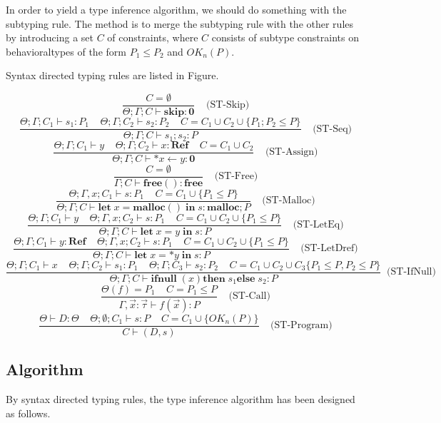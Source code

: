 \documentclass[english]{jssst_ppl} %
\newcommand\LET{\mathbf{let}\;}
\newcommand\IN{\mathbf{in}\;}
\newcommand\SKIP{\mathbf{skip}}
\newcommand\Rtab{\; \; \; \;}
\newcommand\IFNULL{\mathbf{ifnull}\;}
\newcommand\THEN{\mathbf{then}\;}
\newcommand\ELSE{\mathbf{else}\;}
\newcommand\Malloc{\mathbf{malloc}}
\newcommand\Free{\mathbf{free}}
\newcommand\Cirx{(x)}
\begin{document}
In order to yield a type inference algorithm, we should do something with the subtyping rule. The method is to merge the subtyping rule with the other rules by introducing a set $C$ of constraints, where $C$ consists of subtype constraints on behavioraltypes of the form $P_{1}\le P_{2}$ and $OK_{n}(P)$.

Syntax directed typing rules are listed in Figure.

$$
     \frac{ C = \emptyset}
           {\Theta; \Gamma; C \vdash \SKIP : \mathbf{0}}
      \Rtab \mbox{(ST-Skip)}
$$
$$
      \frac{\Theta;\Gamma ; C_{1} \vdash s_{1} : P_{1} \Rtab \Theta; \Gamma ; C_{2} \vdash s_{2} : P_{2} \Rtab C = C_{1}\cup C_{2} \cup \{ P_{1};P_{2} \le P\}}
      {\Theta;\Gamma; C \vdash s_{1};s_{2} : P}
      \Rtab \mbox{(ST-Seq)}
$$
$$
      \frac{\Theta;\Gamma;C_{1} \vdash y \Rtab \Theta;\Gamma; C_{2} \vdash x : \mathbf{Ref} \Rtab C = C_{1}\cup C_{2}}
      {\Theta;\Gamma; C \vdash *x \leftarrow y : \mathbf{0}}
      \Rtab \mbox{(ST-Assign)}
$$
$$
      \frac{C = \emptyset}
      {\Gamma ; C \vdash \Free() : \Free}
     \Rtab \mbox{(ST-Free)}
$$
$$
     \frac{\Theta;\Gamma, x ; C_{1} \vdash s : P_{1} \Rtab C = C_{1} \cup\{P_{1}\le P\}}
     {\Theta;\Gamma; C \vdash \LET x = \Malloc() \; \IN s : \Malloc ; P}
     \Rtab \mbox{(ST-Malloc)}
$$
$$
     \frac{\Theta;\Gamma; C_{1} \vdash y \Rtab \Theta;\Gamma, x ; C_{2} \vdash s : P_{1} \Rtab C = C_{1}\cup C_{2} \cup \{P_{1} \le P \}}
     {\Theta;\Gamma ; C \vdash \LET x = y \;  \IN s : P}
     \Rtab \mbox{(ST-LetEq)}
$$
$$
     \frac{\Theta;\Gamma ; C_{1} \vdash y: \mathbf{Ref} \Rtab \Theta;\Gamma, x ; C_{2} \vdash s : P_{1} \Rtab C = C_{1}\cup C_{2}\cup\{P_{1} \le P\}}
     {\Theta;\Gamma ; C \vdash \LET x = *y \; \IN s : P}
     \Rtab \mbox{(ST-LetDref)}
$$
$$
     \frac{\Theta;\Gamma; C_{1} \vdash x \Rtab \Theta;\Gamma; C_{2} \vdash s_{1} : P_{1} \Rtab \Theta;\Gamma; C_{3} \vdash s_{2} : P_{2}  \Rtab  C = C_{1} \cup C_{2} \cup C_{3} \{P_{1}\le P, P_{2}\le P \}}
     {\Theta;\Gamma; C \vdash \IFNULL\Cirx \THEN s_{1} \ELSE s_{2} : P }
    \; \;  \mbox{(ST-IfNull)}
$$
$$
     \frac{\Theta(f) = P_{1} \Rtab C = P_{1} \le P}
     {\Gamma,\vec{x}:\vec{\tau} \vdash f(\vec{x}) : P }
     \Rtab \mbox{(ST-Call)}
$$
$$
     \frac{\Theta \vdash D : \Theta \Rtab \Theta ; \emptyset ; C_{1} \vdash s : P \Rtab C = C_{1}\cup\{OK_{n}(P)\}}
     {C \vdash (D , s) }
     \Rtab \mbox{(ST-Program)}
$$
\subsection{Algorithm}
By syntax directed typing rules, the type inference algorithm has been designed as follows.
\end{document}
